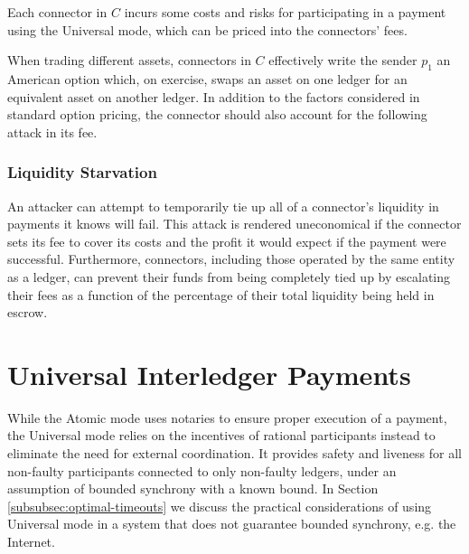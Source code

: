 \documentclass[letterpaper,twocolumn,10pt]{article}
\begin{document}
Each connector in $C$ incurs some costs and risks for participating in a payment using the Universal mode, which can be priced into the connectors' fees.

When trading different assets, connectors in $C$ effectively write the sender $p_1$ an American option \cite{black1973pricing}\cite{brennan1977valuation}
which, on exercise, swaps an asset on one ledger for an equivalent asset on another ledger.
In addition to the factors considered in standard option pricing, the connector should also account for the following attack in its fee.

\subsubsection{Liquidity Starvation}

An attacker can attempt to temporarily tie up all of a connector's liquidity in payments it knows will fail. This attack is rendered uneconomical if the connector sets its fee to cover its costs and the profit it would expect if the payment were successful. Furthermore, connectors, including those operated by the same entity as a ledger, can prevent their funds from being completely tied up by escalating their fees as a function of the percentage of their total liquidity being held in escrow.

\section{Universal Interledger Payments}
\label{sec:universal}


While the Atomic mode uses notaries to ensure proper execution of a payment, the Universal mode relies on the incentives of rational participants instead to eliminate the need for external coordination. It provides safety and liveness for all non-faulty participants connected to only non-faulty ledgers, under an assumption of bounded synchrony with a known bound. In Section \ref{subsubsec:optimal-timeouts} we discuss the practical considerations of using Universal mode in a system that does not guarantee bounded synchrony, e.g. the Internet.
\end{document}
